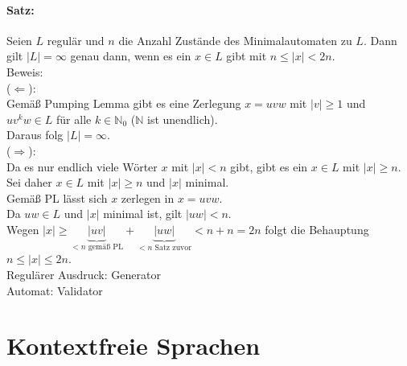 \paragraph{Satz:} Seien $L$ regulär und $n$ die Anzahl Zustände des Minimalautomaten zu $L$. Dann gilt $|L| = \infty$ genau dann, wenn es ein $x \in L$ gibt mit $n\leq  |x| < 2n$.\\
Beweis:\\
($\Leftarrow$):\\
Gemäß Pumping Lemma gibt es eine Zerlegung $x=uvw$ mit $|v| \geq 1$ und $uv^kw\in L$ für alle $k \in \mathbb{N}_0$ ($\mathbb{N}$ ist unendlich).\\
Daraus folg $|L|=\infty$.\\
($\Rightarrow$):\\
Da es nur endlich viele Wörter $x$ mit $|x|<n$ gibt, gibt es ein $x\in L$ mit $|x|\geq n$.\\
Sei daher $x\in L$ mit $|x| \geq n$ und $|x|$ minimal.\\
Gemäß PL lässt sich $x$ zerlegen in $x=uvw$.\\
Da $uw \in L$ und $|x|$ minimal ist, gilt $|uw|<n$.\\
Wegen $|x|\geq \underbrace{|uv|}_{<n \text{ gemäß PL}}+\underbrace{|uw|}_{<n \text{ Satz zuvor}}<n+n=2n$ folgt die Behauptung $n \leq |x| \leq 2n$. \\
Regulärer Ausdruck: Generator\\
Automat: Validator
\section{Kontextfreie Sprachen}

